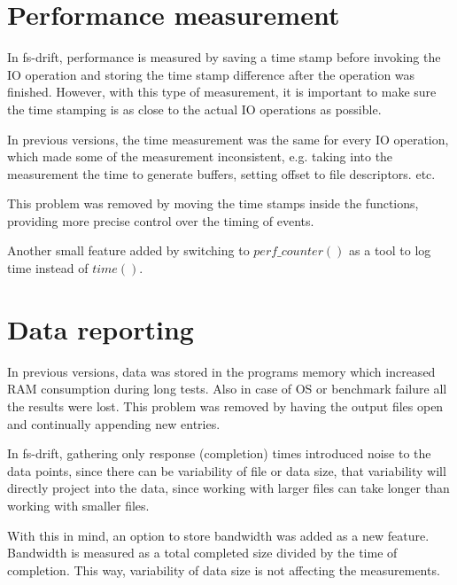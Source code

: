 \documentclass[
  color, %
  table, %
  lof,   %
  lot,   %
]{fithesis3}
\begin{document}
\section{Performance measurement}
In fs-drift, performance is measured by saving a time stamp before invoking the IO operation and storing the time stamp difference after the operation was finished. However, with this type of measurement, it is important to make sure the time stamping is as close to the actual IO operations as possible. 

In previous versions, the time measurement was the same for every IO operation, which made some of the measurement inconsistent, e.g. taking into the measurement the time to generate buffers, setting offset to file descriptors. etc.

This problem was removed by moving the time stamps inside the functions, providing more precise control over the timing of events.

Another small feature added by switching to $perf\_counter()$ as a tool to log time instead of $time()$.


\section{Data reporting}
In previous versions, data was stored in the programs memory which increased RAM consumption during long tests. Also in case of OS or benchmark failure all the results were lost. This problem was removed by having the output files open and continually appending new entries.

In fs-drift, gathering only response (completion) times introduced noise to the data points, since there can be variability of file or data size, that variability will directly project into the data, since working with larger files can take longer than working with smaller files.

With this in mind, an option to store bandwidth was added as a new feature. Bandwidth is measured as a total completed size divided by the time of completion. This way, variability of data size is not affecting the measurements.

\end{document}
